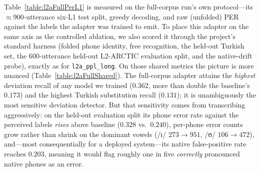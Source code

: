 \documentclass[a4paper,12pt]{report}
\newcommand{\ipa}[1]{{\ipafont #1}}
\begin{document}
Table~\ref{table:l2aFullPerL1} is measured on the full-corpus run's own protocol---its $\approx$900-utterance six-L1 test split, greedy decoding, and raw (unfolded) PER against the labels the adapter was trained to emit. To place this adapter on the same axis as the controlled ablation, we also scored it through the project's standard harness (folded phone identity, free recognition, the held-out Turkish set, the 600-utterance held-out L2-ARCTIC evaluation split, and the native-drift probe), exactly as for \texttt{l2a\_ppl\_long}. On those shared metrics the picture is more nuanced (Table~\ref{table:l2aFullShared}). The full-corpus adapter attains the \emph{highest} deviation recall of any model we trained ($0.362$, more than double the baseline's $0.173$) and the highest Turkish substitution recall ($0.131$); it is unambiguously the most sensitive deviation detector. But that sensitivity comes from transcribing aggressively: on the held-out evaluation split its phone error rate against the perceived labels \emph{rises} above baseline ($0.328$ vs.\ $0.240$), per-phone error counts grow rather than shrink on the dominant vowels (\ipa{/ɪ/} $273 \rightarrow 951$, \ipa{/ʊ/} $106 \rightarrow 472$), and---most consequentially for a deployed system---its native false-positive rate reaches $0.203$, meaning it would flag roughly one in five \emph{correctly} pronounced native phones as an error.

\begin{table}[h]
\centering
\caption[Full-corpus adapter on the shared evaluation axis]{The full-corpus adapter (\texttt{l2a\_ppl\_full}) scored through the project's standard harness, alongside the baseline and the deployed \texttt{l2a\_ppl\_long}, so all three sit on one axis (cf.\ Table~\ref{table:ftAblation}). TR = Turkish-native held-out set; L2A = held-out L2-ARCTIC evaluation set; native FPR is drift on correct native speech (lower is better).}
\label{table:l2aFullShared}
\end{table}
\end{document}
